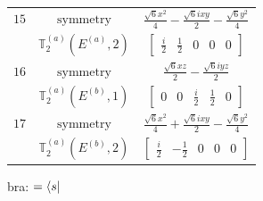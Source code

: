 \documentclass[fleqn,8pt,landscape]{jsarticle}
\begin{document}
\begin{longtable}{ccc}
$ 15 $ & $ \text{symmetry} $ & $ \frac{\sqrt{6} x^{2}}{4} - \frac{\sqrt{6} i x y}{2} - \frac{\sqrt{6} y^{2}}{4} $ \\
$  $ & $ \mathbb{T}_{2}^{(a)}(E^{(a)},2) $ & $ \begin{bmatrix} \frac{i}{2} & \frac{1}{2} & 0 & 0 & 0 \end{bmatrix} $ \\ \hline
$ 16 $ & $ \text{symmetry} $ & $ \frac{\sqrt{6} x z}{2} - \frac{\sqrt{6} i y z}{2} $ \\
$  $ & $ \mathbb{T}_{2}^{(a)}(E^{(b)},1) $ & $ \begin{bmatrix} 0 & 0 & \frac{i}{2} & \frac{1}{2} & 0 \end{bmatrix} $ \\ \hline
$ 17 $ & $ \text{symmetry} $ & $ \frac{\sqrt{6} x^{2}}{4} + \frac{\sqrt{6} i x y}{2} - \frac{\sqrt{6} y^{2}}{4} $ \\
$  $ & $ \mathbb{T}_{2}^{(a)}(E^{(b)},2) $ & $ \begin{bmatrix} \frac{i}{2} & - \frac{1}{2} & 0 & 0 & 0 \end{bmatrix} $ \\ \hline
\end{longtable}
bra: $=\bra{s}$
\end{document}
